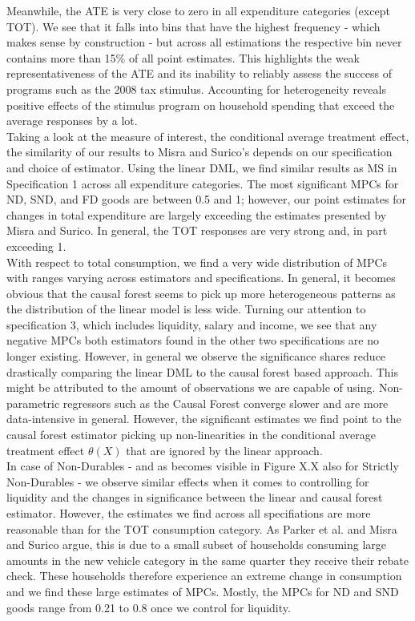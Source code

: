 Meanwhile, the ATE is very close to zero in all expenditure categories (except TOT). We see that it falls into bins that have the highest frequency - which makes sense by construction - but across all estimations the respective bin never contains more than 15\% of all point estimates. This highlights the weak representativeness of the ATE and its inability to reliably assess the success of programs such as the 2008 tax stimulus. Accounting for heterogeneity reveals positive effects of the stimulus program on household spending that exceed the average responses by a lot. \\
Taking a look at the measure of interest, the conditional average treatment effect, the similarity of our results to Misra and Surico's depends on our specification and choice of estimator. Using the linear DML, we find similar results as MS in Specification 1 across all expenditure categories. The most significant MPCs for ND, SND, and FD goods are between 0.5 and 1; however, our point estimates for changes in total expenditure are largely exceeding the estimates presented by Misra and Surico. In general, the TOT responses are very strong and, in part exceeding 1. \\
With respect to total consumption, we find a very wide distribution of MPCs with ranges varying across estimators and specifications. In general, it becomes obvious that the causal forest seems to pick up more heterogeneous patterns as the distribution of the linear model is less wide. Turning our attention to specification 3, which includes liquidity, salary and income, we see that any negative MPCs both estimators found in the other two specifications are no longer existing. However, in general we observe the significance shares reduce drastically comparing the linear DML to the causal forest based approach. This might be attributed to the amount of observations we are capable of using. Non-parametric regressors such as the Causal Forest converge slower and are more data-intensive in general. However, the significant estimates we find point to the causal forest estimator picking up non-linearities in the conditional average treatment effect $\theta(X)$ that are ignored by the linear approach. \\
In case of Non-Durables - and as becomes visible in Figure X.X also for Strictly Non-Durables - we observe similar effects when it comes to controlling for liquidity and the changes in significance between the linear and causal forest estimator. However, the estimates we find across all specifiations are more reasonable than for the TOT consumption category. As Parker et al. and Misra and Surico argue, this is due to a small subset of households consuming large amounts in the new vehicle category in the same quarter they receive their rebate check. These households therefore experience an extreme change in consumption and we find these large estimates of MPCs. Mostly, the MPCs for ND and SND goods range from 0.21 to 0.8 once we control for liquidity. \\
